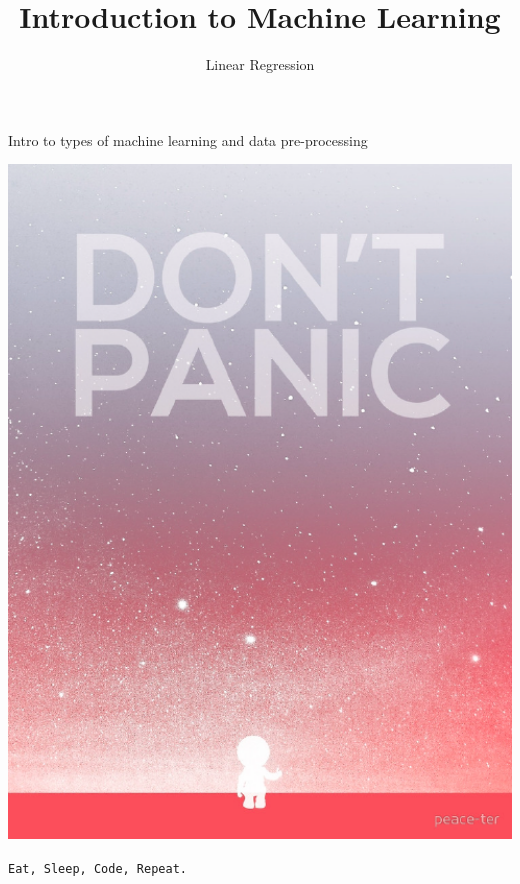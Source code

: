 \documentclass{42-en}
\begin{document}
\title{Introduction to Machine Learning}
\subtitle{Linear Regression}


\summary
{
Intro to types of machine learning and data pre-processing 
}

\maketitle

\tableofcontents


\newpage

\bigskip

\centerline{\includegraphics[width=150mm]{images/dontpanic.png}}

\centerline{\texttt{Eat, Sleep, Code, Repeat.}}

\end{document}
